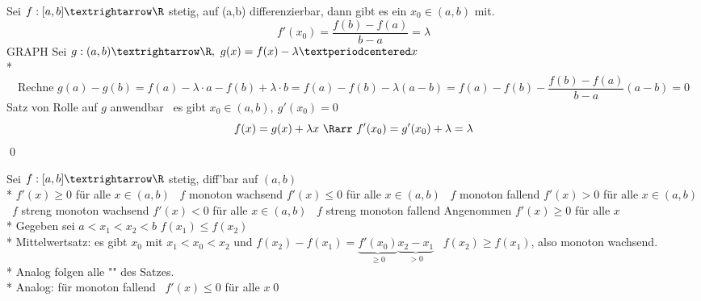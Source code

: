 Sei $f:[a,b]→\R$ stetig, auf (a,b) differenzierbar, dann gibt es ein $x_0\in (a,b)$ mit.
$$f'(x_0)=\frac{f(b)-f(a)}{b-a}=\lambda$$
GRAPH
\bew
Sei $g:(a,b)→\R,\ g(x)=f(x)-\lambda·x$\\*
$$\text{Rechne }g(a)-g(b)=f(a)-\lambda·a-f(b)+\lambda·b = f(a)-f(b)-\lambda(a-b)=f(a)-f(b)-\frac{f(b)-f(a)}{b-a}(a-b)=0$$
Satz von Rolle auf $g$ anwendbar \Rarr\ es gibt $x_0\in (a,b),\ g'(x_0)=0$
$$f(x)=g(x)+\lambda x\ \Rarr\ f'(x_0)=g'(x_0)+\lambda=\lambda$$ \qed


Sei $f:[a,b]→\R$ stetig, diff'bar auf $(a,b)$\\*
$f'(x)\geq 0$ für alle $x\in (a,b)$ \equ\ $f$ monoton wachsend
$f'(x)\leq 0$ für alle $x\in (a,b)$ \equ\ $f$ monoton fallend
$f'(x)> 0$ für alle $x\in (a,b)$ \Rarr\ $f$ streng monoton wachsend
$f'(x)< 0$ für alle $x\in (a,b)$ \Rarr\ $f$ streng monoton fallend
\bew
Angenommen $f'(x)\geq 0$ für alle $x$\\*
Gegeben sei $a<x_1<x_2<b$
$f(x_1)\leq f(x_2)$\\*
Mittelwertsatz: es gibt $x_0$ mit $x_1<x_0<x_2$ und $f(x_2)-f(x_1)=\underbrace{f'(x_0)}_{\geq 0}\underbrace{x_2-x_1}_{>0}$ \Rarr\ $f(x_2)\geq f(x_1)$, also monoton wachsend.\\*
Analog folgen alle "\Rarr" des Satzes.\\*
Analog: für monoton fallend \Rarr\ $f'(x)\leq 0$ für alle $x$\qed
\bsp
{}

